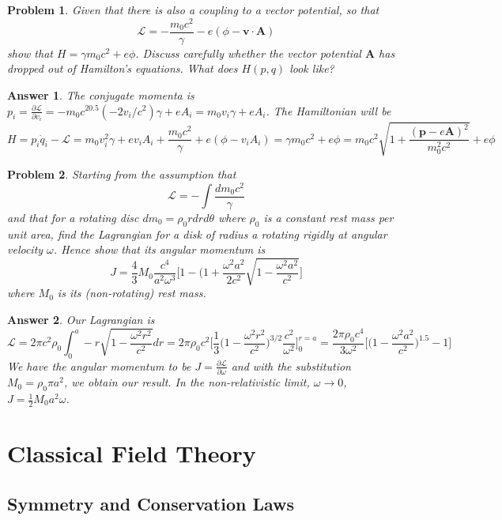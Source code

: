 \documentclass[a4paper]{article}
\newtheorem{ans}{Answer}[subsection]
\theoremstyle{new}
\newtheorem{qns}{Problem}[section]
\begin{document}
\begin{qns}
Given that there is also a coupling to a vector potential, so that
$$\mathcal{L}=-\frac{m_0c^2}{\gamma}-e(\phi-\mathbf{v}\cdot\mathbf{A})$$
show that $H=\gamma m_0c^2+e\phi$. Discuss carefully whether the vector potential $\mathbf{A}$ has dropped out of Hamilton’s equations. What does $H(p,q)$ look like?
\end{qns}
\begin{ans}
The conjugate momenta is $p_i=\frac{\partial\mathcal{L}}{\partial v_i}=-m_0c^20.5(-2v_i/c^2)\gamma+eA_i=m_0v_i\gamma+eA_i$. The Hamiltonian will be
$$H=p_i\dot{q}_i-\mathcal{L}=m_0v_i^2\gamma+ev_iA_i+\frac{m_0c^2}{\gamma}+e(\phi-v_iA_i)=\gamma m_0c^2+e\phi=m_0c^2\sqrt{1+\frac{(\mathbf{p}-e\mathbf{A})^2}{m_0^2c^2}}+e\phi$$
\end{ans}
\begin{qns}
Starting from the assumption that
$$\mathcal{L}=-\int\frac{dm_0c^2}{\gamma}$$
and that for a rotating disc $dm_0=\rho_0rdrd\theta$
where $\rho_0$ is a constant rest mass per unit area, find the Lagrangian for a disk of radius a rotating rigidly at angular velocity $\omega$. Hence show that its angular momentum is
$$J=\frac{4}{3}M_0\frac{c^4}{a^2\omega^3}\bigg[1-\bigg(1+\frac{\omega^2a^2}{2c^2}\sqrt{1-\frac{\omega^2a^2}{c^2}}\bigg]$$
where $M_0$ is its (non-rotating) rest mass.
\end{qns}
\begin{ans}
Our Lagrangian is
$$\mathcal{L}=2\pi c^2\rho_0\int_0^a-r\sqrt{1-\frac{\omega^2r^2}{c^2}}dr=2\pi\rho_0c^2\bigg[\frac{1}{3}\bigg(1-\frac{\omega^2r^2}{c^2}\bigg)^{3/2}\frac{c^2}{\omega^2}\bigg]_0^{r=a}=\frac{2\pi\rho_0c^4}{3\omega^2}\bigg[\bigg(1-\frac{\omega^2a^2}{c^2}\bigg)^{1.5}-1\bigg]$$
We have the angular momentum to be $J=\frac{\partial\mathcal{L}}{\partial\omega}$ and with the substitution $M_0=\rho_0\pi a^2$, we obtain our result. In the non-relativistic limit, $\omega\rightarrow 0$, $J=\frac{1}{2}M_0a^2\omega$.
\end{ans}
\newpage
\section{Classical Field Theory}
\subsection{Symmetry and Conservation Laws}
\end{document}
